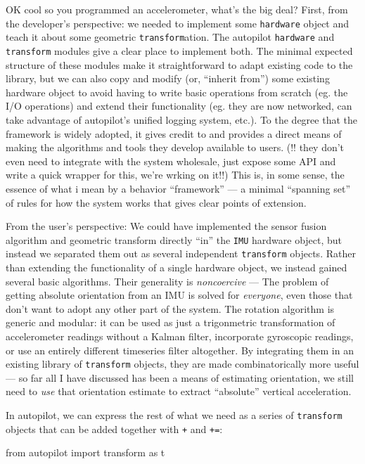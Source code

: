 \documentclass[11pt]{article}
\newenvironment{Shaded}{}{}
\newcommand{\ImportTok}[1]{#1}
\newcommand{\NormalTok}[1]{#1}
\begin{document}
\begin{multicols}{2}
OK cool so you programmed an accelerometer, what's the big deal? First,
from the developer's perspective: we needed to implement some
\texttt{hardware} object and teach it about some geometric
\texttt{transform}ation. The autopilot \texttt{hardware} and
\texttt{transform} modules give a clear place to implement both. The
minimal expected structure of these modules make it straightforward to
adapt existing code to the library, but we can also copy and modify (or,
``inherit from'') some existing hardware object to avoid having to write
basic operations from scratch (eg. the I/O operations) and extend their
functionality (eg. they are now networked, can take advantage of
autopilot's unified logging system, etc.). To the degree that the
framework is widely adopted, it gives credit to and provides a direct
means of making the algorithms and tools they develop available to
users. (!! they don't even need to integrate with the system wholesale,
just expose some API and write a quick wrapper for this, we're wrking on
it!!) This is, in some sense, the essence of what i mean by a behavior
``framework'' --- a minimal ``spanning set'' of rules for how the system
works that gives clear points of extension.

From the user's perspective: We could have implemented the sensor fusion
algorithm and geometric transform directly ``in'' the \texttt{IMU}
hardware object, but instead we separated them out as several
independent \texttt{transform} objects. Rather than extending the
functionality of a single hardware object, we instead gained several
basic algorithms. Their generality is \emph{noncoercive} --- The problem
of getting absolute orientation from an IMU is solved for
\emph{everyone}, even those that don't want to adopt any other part of
the system. The rotation algorithm is generic and modular: it can be
used as just a trigonmetric transformation of accelerometer readings
without a Kalman filter, incorporate gyroscopic readings, or use an
entirely different timeseries filter altogether. By integrating them in
an existing library of \texttt{transform} objects, they are made
combinatorically more useful --- so far all I have discussed has been a
means of estimating orientation, we still need to \emph{use} that
orientation estimate to extract ``absolute'' vertical acceleration.

In autopilot, we can express the rest of what we need as a series of
\texttt{transform} objects that can be added together with \texttt{+}
and \texttt{+=}:

\begin{Shaded}
\begin{Highlighting}[]
\ImportTok{from}\NormalTok{ autopilot }\ImportTok{import}\NormalTok{ transform }\ImportTok{as}\NormalTok{ t}


\end{Highlighting}
\end{Shaded}
\end{multicols}
\end{document}
